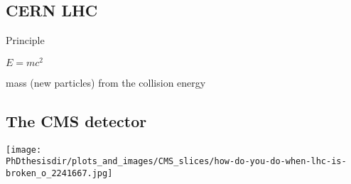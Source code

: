 \subsection*{CERN LHC}
\begin{frame}{Principle}

\begin{center}
{\LARGE $E = mc^2$}

\vfill

mass (new particles) from the collision energy
\end{center}

\end{frame}

%


\subsection*{The CMS detector}


%
%


\begin{frame}
\vspace{-2.3pt}
\begin{center}
\texttt{[image: \\PhDthesisdir/plots\_and\_images/CMS\_slices/how-do-you-do-when-lhc-is-broken\_o\_2241667.jpg]}
\end{center}
\vspace{-7pt}
\end{frame}


%
